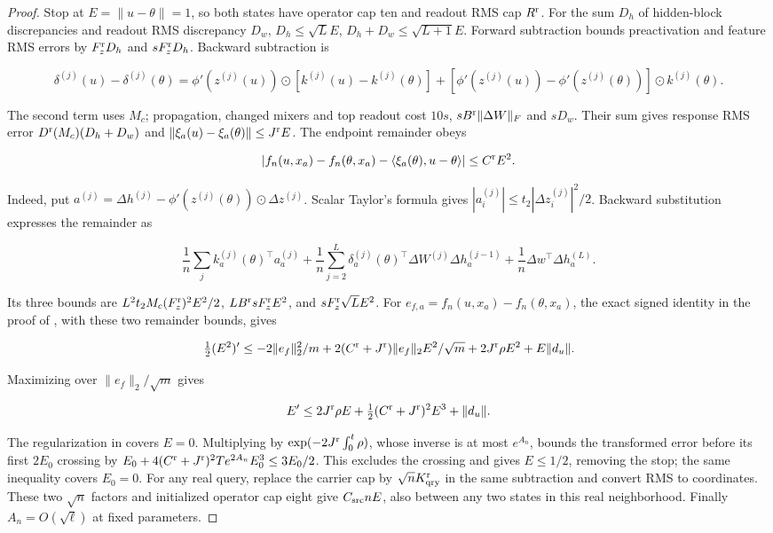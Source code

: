 \begin{proof}
Stop at $E=\|u-\theta\|=1$, so both states have operator cap ten
and readout RMS cap $R^{\rm r}$. For the sum $D_h$ of hidden-block
discrepancies and readout RMS discrepancy $D_w$,
$D_h\le\sqrt L E$, $D_h+D_w\le\sqrt{L+1}E$.
Forward subtraction bounds preactivation and feature RMS errors by
$F_z^{\rm r}D_h$ and $sF_z^{\rm r}D_h$. Backward subtraction is

\[
\delta^{(j)}(u)-\delta^{(j)}(\theta)
=\phi'(z^{(j)}(u))\odot[k^{(j)}(u)-k^{(j)}(\theta)]
 +[\phi'(z^{(j)}(u))-\phi'(z^{(j)}(\theta))]\odot k^{(j)}(\theta).
\]

The second term uses $M_c$; propagation, changed mixers and top readout
cost $10s$, $sB^{\rm r}\|\Delta W\|_F$ and $sD_w$.
Their sum gives response RMS error $D^{\rm r}(M_c)(D_h+D_w)$
and $\|\xi_a(u)-\xi_a(\theta)\|\le J^{\rm r}E$.
The endpoint remainder obeys

\[
|f_n(u,x_a)-f_n(\theta,x_a)-\langle\xi_a(\theta),u-\theta\rangle|
 \le C^{\rm r}E^2.
\]

Indeed, put
$a^{(j)}=\Delta h^{(j)}-\phi'(z^{(j)}(\theta))\odot\Delta z^{(j)}$.
Scalar Taylor's formula gives
$|a_i^{(j)}|\le t_2|\Delta z_i^{(j)}|^2/2$.
Backward substitution expresses the remainder as

\[
\frac1n\sum_j k_a^{(j)}(\theta)^\top a_a^{(j)}
 +\frac1n\sum_{j=2}^L\delta_a^{(j)}(\theta)^\top
                  \Delta W^{(j)}\Delta h_a^{(j-1)}
 +\frac1n\Delta w^\top\Delta h_a^{(L)}.
\]

Its three bounds are
$L^2t_2M_c(F_z^{\rm r})^2E^2/2$,
$LB^{\rm r}sF_z^{\rm r}E^2$, and $sF_z^{\rm r}\sqrt L E^2$.
For $e_{f,a}=f_n(u,x_a)-f_n(\theta,x_a)$, the exact signed identity
in the proof of , with these two remainder bounds, gives

\[
\tfrac12(E^2)'
\le-2\|e_f\|_2^2/m
 +2(C^{\rm r}+J^{\rm r})\|e_f\|_2E^2/\sqrt m
 +2J^{\rm r}\rho E^2+E\|d_u\|.
\]

Maximizing over $\|e_f\|_2/\sqrt m$ gives

\begin{equation}
\label{cp:init:eq:signed-defect}
E'\le2J^{\rm r}\rho E+\tfrac12(C^{\rm r}+J^{\rm r})^2E^3+\|d_u\|.
\end{equation}

The regularization in  covers $E=0$.
Multiplying by $\exp(-2J^{\rm r}\int_0^t\rho)$, whose inverse is
at most $e^{A_n}$, bounds the transformed error before its first
$2E_0$ crossing by
$E_0+4(C^{\rm r}+J^{\rm r})^2Te^{2A_n}E_0^3\le3E_0/2$.
This excludes the crossing and gives $E\le1/2$, removing the stop;
the same inequality covers $E_0=0$.
For any real query, replace the carrier cap by
$\sqrt nK_{\rm qry}^{\rm r}$ in the same subtraction and convert
RMS to coordinates. These two $\sqrt n$ factors and initialized
operator cap eight give $C_{\rm src}nE$, also between any two
states in this real neighborhood. Finally $A_n=O(\sqrt\ell)$
at fixed parameters.
\end{proof}


